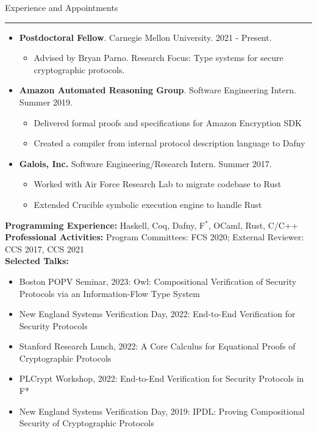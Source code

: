 \documentclass{article}
\begin{document}
\vspace{10pt}
{\huge Experience and Appointments}
\vspace{3pt}
 \hrule
\begin{itemize}
    \item {\bf Postdoctoral Fellow}. Carnegie Mellon University. 2021 - Present.
        \begin{itemize}
            \item Advised by Bryan Parno. Research Focus: Type systems for secure cryptographic protocols. 
        \end{itemize}

    \item {\bf Amazon Automated Reasoning Group}. Software Engineering Intern.
        Summer 2019.
        \begin{itemize}
            \item Delivered formal proofs and specifications for Amazon Encryption SDK
            \item Created a compiler from internal protocol description language to Dafny
        \end{itemize}

    \item {\bf Galois, Inc.} Software Engineering/Research Intern. Summer 2017.
        \begin{itemize}
            \item Worked with Air Force Research Lab to migrate codebase to Rust
            \item Extended Crucible symbolic execution engine to handle Rust
        \end{itemize}

\end{itemize}
    {\bf Programming Experience:} Haskell, Coq, Dafny, F$^*$, OCaml, Rust, C/C++
    \\
    {\bf Professional Activities:} Program Committees: FCS 2020; External Reviewer: CCS 2017, CCS 2021
    \\
    {\bf Selected Talks:} 
    \begin{itemize}
        \item Boston POPV Seminar, 2023: Owl: Compositional Verification of
            Security Protocols via an Information-Flow Type System
        \item New England Systems Verification Day, 2022:  End-to-End Verification for Security Protocols
        \item Stanford Research Lunch, 2022: A Core Calculus for Equational Proofs of Cryptographic Protocols
        \item PLCrypt Workshop, 2022: End-to-End Verification for Security Protocols in F* 
        \item New England Systems Verification Day, 2019: IPDL: Proving Compositional Security of Cryptographic Protocols
    \end{itemize}
\end{document}
